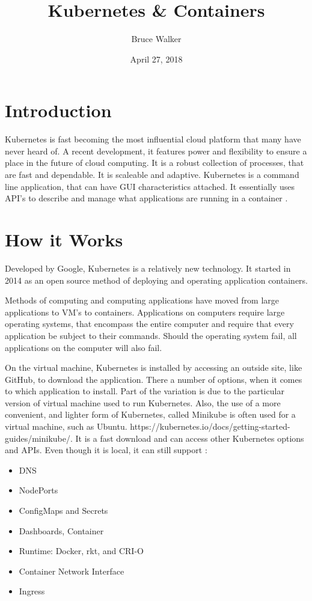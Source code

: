 \documentclass[12pt, letterpaper]{article}
\title{Kubernetes \& Containers}
\author{Bruce Walker}
\date{ April 27, 2018}
\begin{document}
\maketitle 

\section*{Introduction}
\setlength{\parskip}{1em}
\indent 
Kubernetes is fast becoming the most influential cloud platform that many have never heard of.  A recent development, it features power and flexibility to ensure a place in the future of cloud computing.  It is a robust collection of processes, that are fast and dependable.  It is scaleable and adaptive. Kubernetes is a command line application, that can have GUI characteristics attached.  It essentially uses API's to describe and manage what applications are running in a container  \cite{hid-sp18-525-concept}.  

\section *{How it Works}
\setlength{\parskip}{1.3em}

Developed by Google, Kubernetes is a relatively new technology.  It started in 2014 as an open source method of deploying and operating application containers.  

Methods of computing and computing applications have moved from large applications to VM's to containers.  Applications on computers require large operating systems, that encompass the entire computer and require that every application be subject to their commands.  Should the operating system fail, all applications on the computer will also fail.  

On the virtual machine, Kubernetes is installed by accessing an outside site, like GitHub, to download the application.  There a number of options, when it comes to which application to install.  Part of the variation is due to the particular version of virtual machine used to run Kubernetes.  Also, the use of a more convenient, and lighter form of Kubernetes, called Minikube is often used for a virtual machine, such as Ubuntu. https://kubernetes.io/docs/getting-started-guides/minikube/.  It is a fast download and can access other Kubernetes options and APIs.  Even though it is local, it can still support \cite{hid-sp18-525-concept}:
\begin{itemize}
    \item DNS 
    
    \item NodePorts 
    
    \item ConfigMaps and Secrets 
    
    \item Dashboards, Container 
    
    \item Runtime:  Docker, rkt, and CRI-O 
    
    \item Container Network Interface
    
    \item Ingress  
 \end{itemize}   
 
\end{document}
